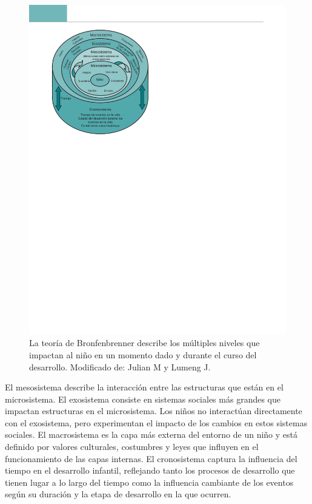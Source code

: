 \documentclass[11pt,letterpaper]{report}
\begin{document}
\begin{figure}
	\centering
    \includegraphics[width=1\linewidth]{sistemasbronfenbrenner}
	\captionsetup{font=footnotesize}
    \caption{La teoría de Bronfenbrenner describe los múltiples niveles que
    impactan al niño en un momento dado y durante el curso del desarrollo.
    Modificado de: Julian M y Lumeng J. \cite{Feldman3}}
    \label{fig:sistemasbronfenbrenner}
\end{figure}

El mesosistema describe la interacción entre las estructuras que están en el
microsistema. El exosistema consiste en sistemas sociales más grandes que
impactan estructuras en el microsistema. Los niños no interactúan directamente
con el exosistema, pero experimentan el impacto de los cambios en estos sistemas
sociales. El macrosistema es la capa más externa del entorno de un niño y está
definido por valores culturales, costumbres y leyes que influyen en el
funcionamiento de las capas internas. El cronosistema captura la influencia del
tiempo en el desarrollo infantil, reflejando tanto los procesos de desarrollo
que tienen lugar a lo largo del tiempo como la influencia cambiante de los
eventos según su duración y la etapa de desarrollo en la que ocurren.
\cite{Feldman3}
\end{document}
